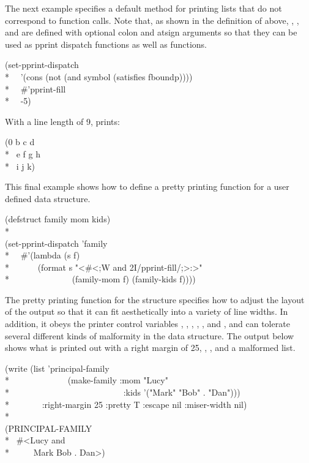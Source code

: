 The next example specifies a default method for printing lists that do not
correspond to function calls.  Note that, as shown in the definition of
 above, , , and
 are defined with optional colon and atsign arguments so that
they can be used as pprint dispatch functions as well as  functions.
\begin{lisp}
(set-pprint-dispatch \\*
~~'(cons (not (and symbol (satisfies fboundp)))) \\*
~~\#'pprint-fill \\*
~~-5)
\end{lisp}
With a line length of 9,  prints:
\begin{lisp}
(0 b c d \\*
~e f g h \\*
~i j k)
\end{lisp}

This final example shows how to define a pretty printing function for a
user defined data structure.
\begin{lisp}
(defstruct family mom kids) \\*
\\
(set-pprint-dispatch 'family \\*
~~\#'(lambda (s f) \\*
~~~~~~(format s "{\Xtilde}\Xatsign<\#<{\Xtilde};{\Xtilde}W and \relax
 {\Xtilde}2I{\Xtilde}\Xunderscore{\Xtilde}/pprint-fill/{\Xtilde};>{\Xtilde}:>" \\*
~~~~~~~~~~~~~~(family-mom f) (family-kids f))))
\end{lisp}

The pretty printing function for the structure  specifies how to
adjust the layout of the output so that it can fit aesthetically into a
variety of line widths.  In addition, it obeys the printer control
variables , , ,
, , and , and can tolerate
several different kinds of malformity in the data structure.  The output below
shows what is printed out with a right margin of 25, 
,  , and a malformed  list.
\begin{lisp}
(write (list 'principal-family \\*
~~~~~~~~~~~~~(make-family :mom "Lucy" \\*
~~~~~~~~~~~~~~~~~~~~~~~~~~:kids '("Mark" "Bob" . "Dan"))) \\*
~~~~~~~:right-margin 25 :pretty T :escape nil :miser-width nil) \\*
\\
(PRINCIPAL-FAMILY \\*
~\#<Lucy and \\*
~~~~~Mark Bob . Dan>)
\end{lisp}

